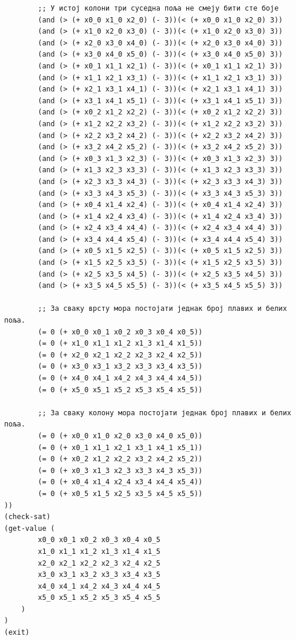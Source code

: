 \documentclass[a4paper]{article}
\begin{document}
\begin{verbatim}
        ;; У истој колони три суседна поља не смеју бити сте боје
        (and (> (+ x0_0 x1_0 x2_0) (- 3))(< (+ x0_0 x1_0 x2_0) 3))
        (and (> (+ x1_0 x2_0 x3_0) (- 3))(< (+ x1_0 x2_0 x3_0) 3))
        (and (> (+ x2_0 x3_0 x4_0) (- 3))(< (+ x2_0 x3_0 x4_0) 3))
        (and (> (+ x3_0 x4_0 x5_0) (- 3))(< (+ x3_0 x4_0 x5_0) 3))
        (and (> (+ x0_1 x1_1 x2_1) (- 3))(< (+ x0_1 x1_1 x2_1) 3))
        (and (> (+ x1_1 x2_1 x3_1) (- 3))(< (+ x1_1 x2_1 x3_1) 3))
        (and (> (+ x2_1 x3_1 x4_1) (- 3))(< (+ x2_1 x3_1 x4_1) 3))
        (and (> (+ x3_1 x4_1 x5_1) (- 3))(< (+ x3_1 x4_1 x5_1) 3))
        (and (> (+ x0_2 x1_2 x2_2) (- 3))(< (+ x0_2 x1_2 x2_2) 3))
        (and (> (+ x1_2 x2_2 x3_2) (- 3))(< (+ x1_2 x2_2 x3_2) 3))
        (and (> (+ x2_2 x3_2 x4_2) (- 3))(< (+ x2_2 x3_2 x4_2) 3))
        (and (> (+ x3_2 x4_2 x5_2) (- 3))(< (+ x3_2 x4_2 x5_2) 3))
        (and (> (+ x0_3 x1_3 x2_3) (- 3))(< (+ x0_3 x1_3 x2_3) 3))
        (and (> (+ x1_3 x2_3 x3_3) (- 3))(< (+ x1_3 x2_3 x3_3) 3))
        (and (> (+ x2_3 x3_3 x4_3) (- 3))(< (+ x2_3 x3_3 x4_3) 3))
        (and (> (+ x3_3 x4_3 x5_3) (- 3))(< (+ x3_3 x4_3 x5_3) 3))
        (and (> (+ x0_4 x1_4 x2_4) (- 3))(< (+ x0_4 x1_4 x2_4) 3))
        (and (> (+ x1_4 x2_4 x3_4) (- 3))(< (+ x1_4 x2_4 x3_4) 3))
        (and (> (+ x2_4 x3_4 x4_4) (- 3))(< (+ x2_4 x3_4 x4_4) 3))
        (and (> (+ x3_4 x4_4 x5_4) (- 3))(< (+ x3_4 x4_4 x5_4) 3))
        (and (> (+ x0_5 x1_5 x2_5) (- 3))(< (+ x0_5 x1_5 x2_5) 3))
        (and (> (+ x1_5 x2_5 x3_5) (- 3))(< (+ x1_5 x2_5 x3_5) 3))
        (and (> (+ x2_5 x3_5 x4_5) (- 3))(< (+ x2_5 x3_5 x4_5) 3))
        (and (> (+ x3_5 x4_5 x5_5) (- 3))(< (+ x3_5 x4_5 x5_5) 3))

        ;; За сваку врсту мора постојати једнак број плавих и белих поља.
        (= 0 (+ x0_0 x0_1 x0_2 x0_3 x0_4 x0_5))
        (= 0 (+ x1_0 x1_1 x1_2 x1_3 x1_4 x1_5))
        (= 0 (+ x2_0 x2_1 x2_2 x2_3 x2_4 x2_5))
        (= 0 (+ x3_0 x3_1 x3_2 x3_3 x3_4 x3_5))
        (= 0 (+ x4_0 x4_1 x4_2 x4_3 x4_4 x4_5))
        (= 0 (+ x5_0 x5_1 x5_2 x5_3 x5_4 x5_5))

        ;; За сваку колону мора постојати једнак број плавих и белих поља.
        (= 0 (+ x0_0 x1_0 x2_0 x3_0 x4_0 x5_0))
        (= 0 (+ x0_1 x1_1 x2_1 x3_1 x4_1 x5_1))
        (= 0 (+ x0_2 x1_2 x2_2 x3_2 x4_2 x5_2))
        (= 0 (+ x0_3 x1_3 x2_3 x3_3 x4_3 x5_3))
        (= 0 (+ x0_4 x1_4 x2_4 x3_4 x4_4 x5_4))
        (= 0 (+ x0_5 x1_5 x2_5 x3_5 x4_5 x5_5))
))
(check-sat)
(get-value (
        x0_0 x0_1 x0_2 x0_3 x0_4 x0_5
        x1_0 x1_1 x1_2 x1_3 x1_4 x1_5
        x2_0 x2_1 x2_2 x2_3 x2_4 x2_5
        x3_0 x3_1 x3_2 x3_3 x3_4 x3_5
        x4_0 x4_1 x4_2 x4_3 x4_4 x4_5
        x5_0 x5_1 x5_2 x5_3 x5_4 x5_5
    )
)
(exit)
\end{verbatim}
\end{document}
